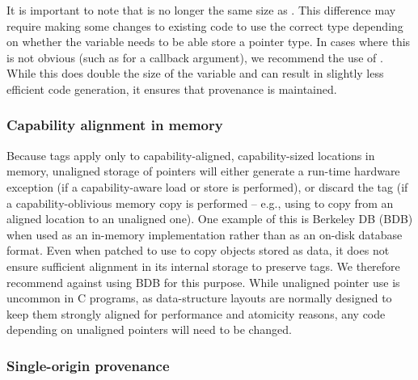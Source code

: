 \documentclass[12pt,twoside,openright,a4paper]{article}
\newcommand{\ccode}[1]{{\small\ttfamily{#1}}}
\newcommand{\cfunc}[1]{{\ccode{#1()}}}
\newcommand{\sizet}{{\ccode{size\_t}}\xspace}
\newcommand{\cuintptrt}{{\ccode{uintptr\_t}}\xspace}
\newcommand{\note}[2]{{\color{blue}[ Note: #1 - #2]}}
\renewcommand{\note}[2]{\relax\ifhmode\unskip\fi}
\newcommand{\amnote}[1]{\note{#1}{Alfredo M.}}
\newcommand{\psnote}[1]{\note{#1}{Peter S.}}
\newcommand{\pgnnote}[1]{\note{#1}{Peter N.}}
\begin{document}
It is important to note that \cuintptrt is no longer the same size as
\sizet. This difference may require making some changes to
existing code to use the correct type depending on whether the variable
needs to be able store a pointer type. In cases where this is not obvious
(such as for a callback argument), we recommend the use of \cuintptrt.
While this does double the size of the variable and can result in slightly
less efficient code generation, it ensures that provenance is maintained.

\pgnnote{The above section begs questions relating to what is the
  responsibility of programmers and what can be aided or managed by
  compilers.  Ideally, the latter would be preferable to requiring
  programmers to understand things are are possibly beyond there so-called
  experience.}

\subsubsection{Capability alignment in memory}

Because tags apply only to capability-aligned, capability-sized locations in
memory, unaligned storage of pointers will either generate a run-time
hardware exception (if a capability-aware load or store is performed), or discard the
tag (if a capability-oblivious memory copy is performed -- e.g., using
\cfunc{memcpy} to copy from an aligned location to an unaligned one).
One example of this is Berkeley DB (BDB) when used as an in-memory
implementation rather than as an on-disk database format.
Even when patched to use \cfunc{memcpy} to copy objects stored as data, it
does not ensure sufficient alignment in its internal storage to preserve tags.
We therefore recommend against using BDB for this purpose.
While unaligned pointer use is uncommon in C programs, as data-structure
layouts are normally designed to keep them strongly aligned for performance
and atomicity reasons, any code depending on unaligned pointers will need
to be changed.

\amnote{Should we mention code that assumes that it is ok to go out of bounds
for optimization purposes? E.g., strcmp loading a word at a time?}
\psnote{yes}

\subsubsection{Single-origin provenance}
\label{sec:ambiguous-provenance}
\end{document}
